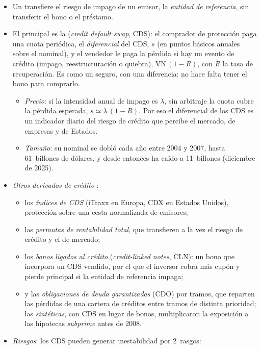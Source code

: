 \documentclass[11pt]{article}
\begin{document}
\begin{itemize}
\item Un  transfiere el riesgo de impago de un emisor, la \emph{entidad de referencia}, sin transferir el bono o el préstamo.
\item El principal es la  (\emph{credit default swap}, CDS): el comprador de protección paga una cuota periódica, el \emph{diferencial} del CDS, $s$ (en puntos básicos anuales sobre el nominal), y el vendedor le paga la pérdida si hay un evento de crédito (impago, reestructuración o quiebra), $\mathrm{VN}\,(1-R)$, con $R$ la tasa de recuperación. Es como un seguro, con una diferencia: no hace falta tener el bono para comprarlo.
  \begin{itemize}
  \item \emph{Precio}: si la intensidad anual de impago es $\lambda$, sin arbitraje la cuota cubre la pérdida esperada, $s\simeq\lambda\,(1-R)$\nocite{Hull2022Options}. Por eso el diferencial de los CDS es un indicador diario del riesgo de crédito que percibe el mercado, de empresas y de Estados.
  \item \emph{Tamaño}: su nominal se dobló cada año entre 2004 y 2007, hasta 61~billones de dólares, y desde entonces ha caído a 11~billones (diciembre de 2025)\nocite{BIS2026OTCDerivados}.
  \end{itemize}
\item \emph{Otros derivados de crédito}\nocite{Hull2022Options} :
  \begin{itemize}
  \item los \emph{índices de CDS} (iTraxx en Europa, CDX en Estados Unidos), protección sobre una cesta normalizada de emisores;
  \item las \emph{permutas de rentabilidad total}, que transfieren a la vez el riesgo de crédito y el de mercado;
  \item los \emph{bonos ligados al crédito} (\emph{credit-linked notes}, CLN): un bono que incorpora un CDS vendido, por el que el inversor cobra más cupón y pierde principal si la entidad de referencia impaga;
  \item y las \emph{obligaciones de deuda garantizadas} (CDO) por tramos, que reparten las pérdidas de una cartera de créditos entre tramos de distinta prioridad; las \emph{sintéticas}, con CDS en lugar de bonos, multiplicaron la exposición a las hipotecas \emph{subprime} antes de 2008.
  \end{itemize}
\item \emph{Riesgos}: los CDS pueden generar inestabilidad por 2~rasgos:

\end{itemize}
\end{document}
